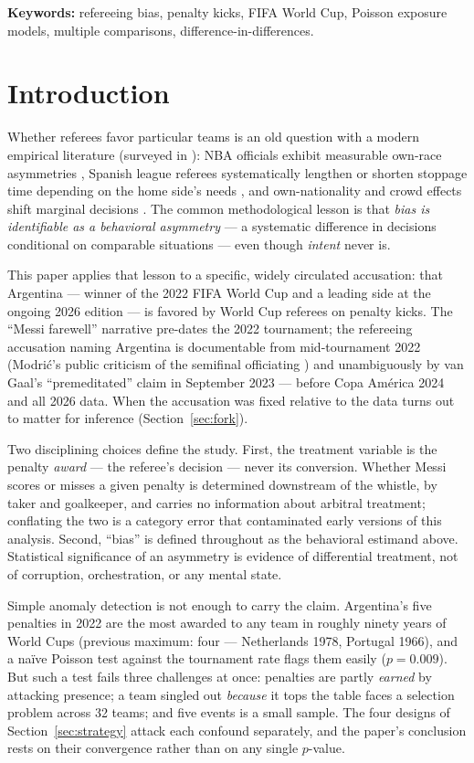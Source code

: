 \documentclass[11pt,a4paper]{article}
\newcommand{\pv}[1]{\ensuremath{p = #1}}
\begin{document}
\vspace{4pt}
\noindent\textbf{Keywords:} refereeing bias, penalty kicks, FIFA World Cup, Poisson
exposure models, multiple comparisons, difference-in-differences.

\section{Introduction}

Whether referees favor particular teams is an old question with a modern empirical
literature (surveyed in \cite{dohmen2016referee}): NBA officials exhibit measurable
own-race asymmetries
\cite{price2010racial}, Spanish league referees systematically lengthen or shorten
stoppage time depending on the home side's needs \cite{garicano2005favoritism}, and
own-nationality and crowd effects shift marginal decisions \cite{pope2015awareness}.
The common
methodological lesson is that \emph{bias is identifiable as a behavioral asymmetry} ---
a systematic difference in decisions conditional on comparable situations --- even
though \emph{intent} never is.

This paper applies that lesson to a specific, widely circulated accusation: that
Argentina --- winner of the 2022 FIFA World Cup and a leading side at the ongoing 2026
edition --- is favored by World Cup referees on penalty kicks. The ``Messi farewell''
narrative pre-dates the 2022 tournament; the refereeing accusation naming Argentina is
documentable from mid-tournament 2022 (Modri\'c's public criticism of the semifinal
officiating \cite{modric2022}) and unambiguously by van Gaal's ``premeditated'' claim
in September 2023 \cite{vangaal2023} --- before Copa Am\'erica 2024 and all 2026 data.
When the accusation was fixed relative to the data turns out to matter for inference
(Section~\ref{sec:fork}).

Two disciplining choices define the study. First, the treatment variable is the
penalty \emph{award} --- the referee's decision --- never its conversion. Whether
Messi scores or misses a given penalty is determined downstream of the whistle, by
taker and goalkeeper, and carries no information about arbitral treatment; conflating
the two is a category error that contaminated early versions of this analysis.
Second, ``bias'' is defined throughout as the behavioral estimand above. Statistical
significance of an asymmetry is evidence of differential treatment, not of corruption,
orchestration, or any mental state.

Simple anomaly detection is not enough to carry the claim. Argentina's five penalties
in 2022 are the most awarded to any team in roughly ninety years of World Cups
(previous maximum: four --- Netherlands 1978, Portugal 1966), and a na\"ive Poisson
test against the tournament rate flags them easily (\pv{0.009}). But such a test
fails three challenges at once: penalties are partly \emph{earned} by attacking
presence; a team singled out \emph{because} it tops the table faces a selection
problem across 32 teams; and five events is a small sample. The four designs of
Section~\ref{sec:strategy} attack each confound separately, and the paper's
conclusion rests on their convergence rather than on any single $p$-value.
\end{document}
